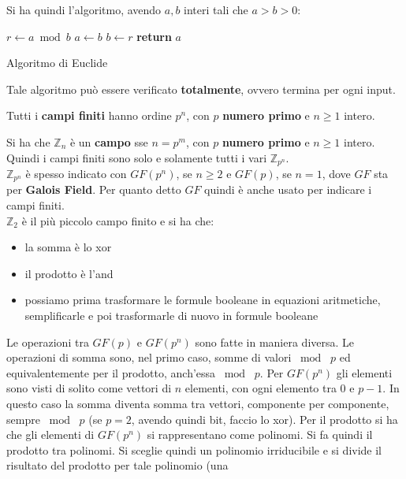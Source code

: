 \documentclass[a4paper,12pt, oneside]{book}
\begin{document}
Si ha quindi l'algoritmo, avendo $a,b$ interi tali che $a>b>0$:
\begin{algorithm}
  \begin{algorithmic}
    \State $r\gets a\bmod b$
    \State $a\gets b$
    \State $b\gets r$ 
    \EndWhile
    \State \textbf{return} $a$
    \EndFunction
  \end{algorithmic}
  \caption{Algoritmo di Euclide}
\end{algorithm}
Tale algoritmo può essere verificato \textbf{totalmente}, ovvero termina per
ogni input.
\begin{teorema}
  Tutti i \textbf{campi finiti} hanno ordine $p^n$, con $p$ \textbf{numero
    primo} e $n\geq 1$ intero.
\end{teorema}
\begin{teorema}
  Si ha che $\mathbb{Z}_n$ è un \textbf{campo} sse $n=p^m$, con $p$
  \textbf{numero primo} e $n\geq 1$ intero. Quindi i campi finiti sono solo e
  solamente tutti i vari $\mathbb{Z}_{p^n}$.\\
  $\mathbb{Z}_{p^n}$ è spesso indicato con $GF(p^n)$, se $n\geq 2$ e $GF(p)$,
  se $n=1$, dove $GF$ sta per \textbf{Galois Field}. Per quanto detto $GF$
  quindi è anche usato per indicare i campi finiti.\\
  $\mathbb{Z}_2$ è il più piccolo campo finito e si ha che:
  \begin{itemize}
    \item la somma è lo xor
    \item il prodotto è l'and
    \item possiamo prima trasformare le formule booleane in equazioni
    aritmetiche, semplificarle e poi trasformarle di nuovo in formule booleane  
  \end{itemize}
\end{teorema}
Le operazioni tra $GF(p)$ e $GF(p^n)$ sono fatte in maniera diversa. Le
operazioni di somma sono, nel primo caso, somme di valori $\bmod\,\,p$ ed
equivalentemente per il prodotto, anch'essa $\bmod\,\,p$. Per $GF(p^n)$ gli
elementi sono visti di solito come vettori di $n$ elementi, con ogni elemento
tra 0 e $p-1$. In questo caso la somma diventa somma tra vettori, componente per
componente, sempre $\bmod\,\,p$ (se $p=2$, avendo quindi bit, faccio lo
xor). Per il prodotto si ha che gli elementi di $GF(p^n)$ si rappresentano come
polinomi. Si fa quindi il prodotto tra polinomi. Si sceglie quindi un polinomio
irriducibile e si divide il risultato del prodotto per tale polinomio (una
\end{document}
